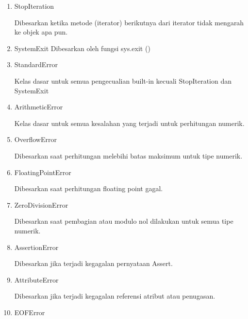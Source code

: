 \vspace{12pt}
 \begin{enumerate}
\item StopIteration 

Dibesarkan ketika metode (iterator) berikutnya dari iterator tidak mengarah ke objek apa pun. 
\vspace{12pt}

\item SystemExit 
Dibesarkan oleh fungsi sys.exit () 
\vspace{12pt}

\item StandardError 
 
Kelas dasar untuk semua pengecualian built-in kecuali StopIteration dan SystemExit 
\vspace{12pt}

\item ArithmeticError 
 
Kelas dasar untuk semua kesalahan yang terjadi untuk perhitungan numerik. 
\vspace{12pt}

\item OverflowError 

Dibesarkan saat perhitungan melebihi batas maksimum untuk tipe numerik.
\vspace{12pt}

\item FloatingPointError   

Dibesarkan saat perhitungan floating point gagal. 
\vspace{12pt}

\item ZeroDivisionError  

Dibesarkan saat pembagian atau modulo nol dilakukan untuk semua tipe numerik. 
\vspace{12pt}
\vspace{12pt}

\item AssertionError 

Dibesarkan jika terjadi kegagalan pernyataan Assert. 
\vspace{12pt}

\item AttributeError 
 
Dibesarkan jika terjadi kegagalan referensi atribut atau penugasan.
\vspace{12pt}

\item EOFError 


\end{enumerate}
